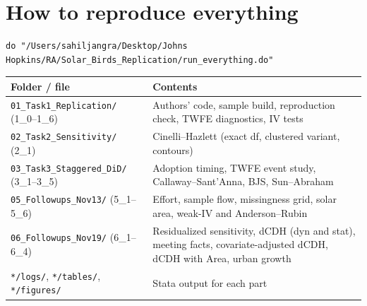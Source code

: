 \documentclass[11pt]{article}
\begin{document}
\section{How to reproduce everything}
\begin{lstlisting}
do "/Users/sahiljangra/Desktop/Johns Hopkins/RA/Solar_Birds_Replication/run_everything.do"
\end{lstlisting}
\begin{center}\small
\begin{tabularx}{\linewidth}{>{\raggedright\arraybackslash}p{6.2cm} X}
\toprule
Folder / file & Contents \\
\midrule
\texttt{01\_Task1\_Replication/} (1\_0--1\_6) & Authors' code, sample build, reproduction check, TWFE diagnostics, IV tests \\
\texttt{02\_Task2\_Sensitivity/} (2\_1) & Cinelli--Hazlett (exact df, clustered variant, contours) \\
\texttt{03\_Task3\_Staggered\_DiD/} (3\_1--3\_5) & Adoption timing, TWFE event study, Callaway--Sant'Anna, BJS, Sun--Abraham \\
\texttt{05\_Followups\_Nov13/} (5\_1--5\_6) & Effort, sample flow, missingness grid, solar area, weak-IV and Anderson--Rubin \\
\texttt{06\_Followups\_Nov19/} (6\_1--6\_4) & Residualized sensitivity, dCDH (dyn and stat), meeting facts, covariate-adjusted dCDH, dCDH with Area, urban growth \\
\texttt{*/logs/}, \texttt{*/tables/}, \texttt{*/figures/} & Stata output for each part \\
\bottomrule
\end{tabularx}
\end{center}
\end{document}

